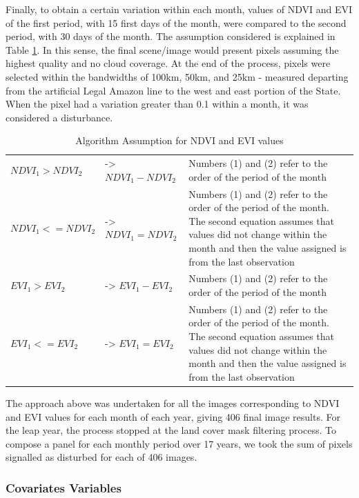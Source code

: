 Finally, to obtain a certain variation within each month, values of NDVI and EVI of the first period, with 15 first days of the month, were compared to the second period, with 30 days of the month. The assumption considered is explained in Table \ref{assumption2}. In this sense, the final scene/image would present pixels assuming the highest quality and no cloud coverage. At the end of the process, pixels were selected within the bandwidths of 100km, 50km, and 25km - measured departing from the artificial Legal Amazon line to the west and east portion of the State. When the pixel had a variation greater than 0.1 within a month, it was considered a disturbance.

\begin{table}[H]
\footnotesize
\caption{Algorithm Assumption for NDVI and EVI values}
\begin{tabularx}{\linewidth}{X X X}
\hline
\hline
$NDVI_{1} > NDVI_{2}$	& ->  $NDVI_{1} - NDVI_{2}$	 & Numbers (1) and (2) refer to the order of the period of the month \\
$NDVI_{1} <= NDVI_{2}$	& ->  $NDVI_{1} = NDVI_{2}$	 & Numbers (1) and (2) refer to the order of the period of the month. The second equation assumes that values did not change within the month and then the value assigned is from the last observation	\\
\hline
$EVI_{1} > EVI_{2}$	& ->  $EVI_{1} - EVI_{2}$	 & Numbers (1) and (2) refer to the order of the period of the month \\
$EVI_{1} <= EVI_{2}$	& ->  $EVI_{1} = EVI_{2}$	 & Numbers (1) and (2) refer to the order of the period of the month. The second equation assumes that values did not change within the month and then the value assigned is from the last observation 	\\
\hline
\hline
\end{tabularx}
\label{assumption2}
\end{table}


The approach above was undertaken for all the images corresponding to NDVI and EVI values for each month of each year, giving 406 final image results. For the leap year, the process stopped at the land cover mask filtering process. To compose a panel for each monthly period over 17 years, we took the sum of pixels signalled as disturbed for each of 406 images. 

\subsubsection{Covariates Variables} \label{covariate variables}  %

